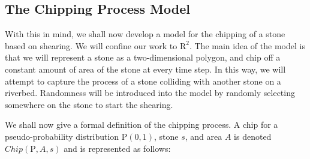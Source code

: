 \subsection{The Chipping Process Model}

With this in mind, we shall now develop a model for the chipping of a stone based on shearing. We will confine our work to $\mathrm{R}^2$. The main idea of the model is that we will represent a stone as a two-dimensional polygon, and chip off a constant amount of area of the stone at every time step. In this way, we will attempt to capture the process of a stone colliding with another stone on a riverbed. Randomness will be introduced into the model by randomly selecting somewhere on the stone to start the shearing.

We shall now give a formal definition of the chipping process. A chip for a pseudo-probability distribution $\mathrm{P}(0,1)$, stone $s$, and area $A$ is denoted $Chip(\mathrm{P}, A, s)$ and is represented as follows:

